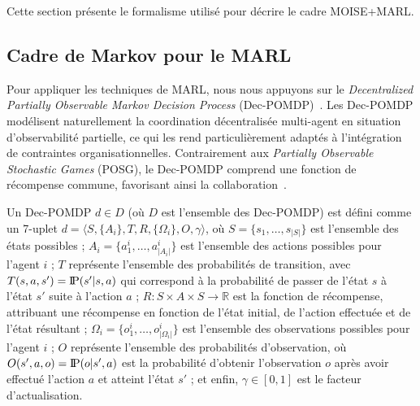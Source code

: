 \documentclass[dissemination]{jfsma}
\newcommand{\probP}{\text{I\kern-0.15em P}}
\begin{document}
Cette section présente le formalisme utilisé pour décrire le cadre MOISE+MARL.

\subsection{Cadre de Markov pour le MARL}

Pour appliquer les techniques de MARL, nous nous appuyons sur le \textit{Decentralized Partially Observable Markov Decision Process} (Dec-POMDP)~\cite{Oliehoek2016}. Les Dec-POMDP modélisent naturellement la coordination décentralisée multi-agent en situation d'observabilité partielle, ce qui les rend particulièrement adaptés à l'intégration de contraintes organisationnelles. Contrairement aux \textit{Partially Observable Stochastic Games} (POSG), le Dec-POMDP comprend une fonction de récompense commune, favorisant ainsi la collaboration~\cite{Beynier2013}.

Un Dec-POMDP $d \in D$ (où $D$ est l'ensemble des Dec-POMDP) est défini comme un 7-uplet 
$d = \langle S, \{A_i\}, T, R, \{\Omega_i\}, O, \gamma \rangle$,
où 
\(S = \{s_1,\dots,s_{|S|}\}\) est l'ensemble des états possibles ; \quad
\(A_i = \{a_{1}^{i},\dots,a_{|A_i|}^{i}\}\) est l'ensemble des actions possibles pour l'agent \(i\) ; \quad
\(T\) représente l'ensemble des probabilités de transition, avec \(T(s,a,s') = \probP(s'|s,a)\) qui correspond à la probabilité de passer de l'état \(s\) à l'état \(s'\) suite à l'action \(a\) ; \quad
\(R : S \times A \times S \rightarrow \mathbb{R}\) est la fonction de récompense, attribuant une récompense en fonction de l'état initial, de l'action effectuée et de l'état résultant ; \quad
\(\Omega_i = \{o_{1}^{i},\dots,o_{|\Omega_i|}^{i}\}\) est l'ensemble des observations possibles pour l'agent \(i\) ; \quad
\(O\) représente l'ensemble des probabilités d'observation, où \(O(s',a,o) = \probP(o|s',a)\) est la probabilité d'obtenir l'observation \(o\) après avoir effectué l'action \(a\) et atteint l'état \(s'\) ; \quad et enfin, \(\gamma \in [0,1]\) est le facteur d'actualisation.
\end{document}
